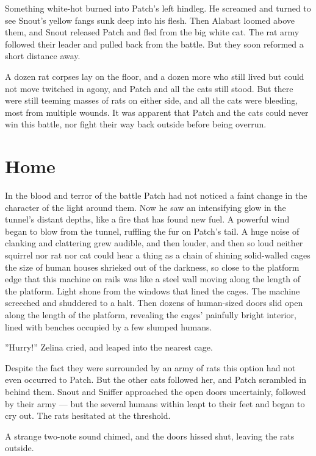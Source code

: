 \documentclass[12pt]{book}
\begin{document}
Something white-hot burned into Patch's left hindleg. He screamed and turned to see Snout's yellow fangs sunk deep into his flesh. Then Alabast loomed above them, and Snout released Patch and fled from the big white cat. The rat army followed their leader and pulled back from the battle. But they soon reformed a short distance away.

A dozen rat corpses lay on the floor, and a dozen more who still lived but could not move twitched in agony, and Patch and all the cats still stood. But there were still teeming masses of rats on either side, and all the cats were bleeding, most from multiple wounds. It was apparent that Patch and the cats could never win this battle, nor fight their way back outside before being overrun.


\section{Home}

In the blood and terror of the battle Patch had not noticed a faint change in the character of the light around them. Now he saw an intensifying glow in the tunnel's distant depths, like a fire that has found new fuel. A powerful wind began to blow from the tunnel, ruffling the fur on Patch's tail. A huge noise of clanking and clattering grew audible, and then louder, and then so loud neither squirrel nor rat nor cat could hear a thing as a chain of shining solid-walled cages the size of human houses shrieked out of the darkness, so close to the platform edge that this machine on rails was like a steel wall moving along the length of the platform. Light shone from the windows that lined the cages. The machine screeched and shuddered to a halt. Then dozens of human-sized doors slid open along the length of the platform, revealing the cages' painfully bright interior, lined with benches occupied by a few slumped humans.

''Hurry!'' Zelina cried, and leaped into the nearest cage.

Despite the fact they were surrounded by an army of rats this option had not even occurred to Patch. But the other cats followed her, and Patch scrambled in behind them. Snout and Sniffer approached the open doors uncertainly, followed by their army ---
but the several humans within leapt to their feet and began to cry out. The rats hesitated at the threshold.

A strange two-note sound chimed, and the doors hissed shut, leaving the rats outside.
\end{document}
